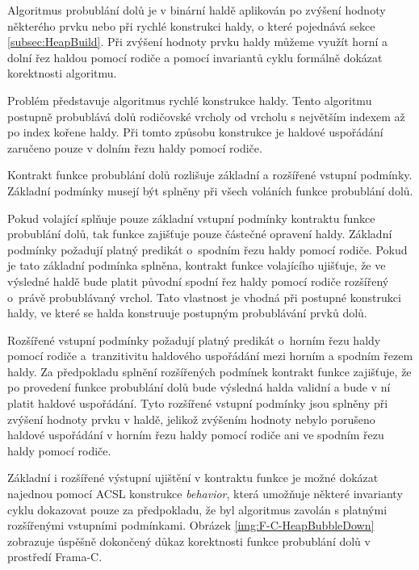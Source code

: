 Algoritmus probublání dolů je v binární haldě aplikován po zvýšení hodnoty některého prvku nebo při rychlé konstrukci haldy, o které pojednává sekce \ref{subsec:HeapBuild}. Při zvýšení hodnoty prvku haldy můžeme využít horní a dolní řez haldou pomocí rodiče a pomocí invariantů cyklu formálně dokázat korektnosti algoritmu.

Problém představuje algoritmus rychlé konstrukce haldy. Tento algoritmu postupně probublává dolů rodičovské vrcholy od vrcholu s největším indexem až po index kořene haldy. Při tomto způsobu konstrukce je haldové uspořádání zaručeno pouze v dolním řezu haldy pomocí rodiče.

Kontrakt funkce probublání dolů rozlišuje základní a rozšířené vstupní podmínky. Základní podmínky musejí být splněny při všech voláních funkce probublání dolů.

Pokud volající splňuje pouze základní vstupní podmínky kontraktu funkce probublání dolů, tak funkce zajišťuje pouze částečné opravení haldy. Základní podmínky požadují platný predikát o~spodním řezu haldy pomocí rodiče. Pokud je tato základní podmínka splněna, kontrakt funkce volajícího ujišťuje, že ve výsledné haldě bude platit původní spodní řez haldy pomocí rodiče rozšířený o~právě probublávaný vrchol. Tato vlastnost je vhodná při postupné konstrukci haldy, ve které se halda konstruuje postupným probublávání prvků dolů.

Rozšířené vstupní podmínky požadují platný predikát o~horním řezu haldy pomocí rodiče a~tranzitivitu haldového uspořádání mezi horním a spodním řezem haldy. Za předpokladu splnění rozšířených podmínek kontrakt funkce zajišťuje, že po provedení funkce probublání dolů bude výsledná halda validní a bude v ní platit haldové uspořádání. Tyto rozšířené vstupní podmínky jsou splněny při zvýšení hodnoty prvku v haldě, jelikož zvýšením hodnoty nebylo porušeno haldové uspořádání v horním řezu haldy pomocí rodiče ani ve spodním řezu haldy pomocí rodiče.

Základní i rozšířené výstupní ujištění v kontraktu funkce je možné dokázat najednou pomocí ACSL konstrukce \textit{behavior}, která umožňuje některé invarianty cyklu dokazovat pouze za předpokladu, že byl algoritmus zavolán s platnými rozšířenými vstupními podmínkami. Obrázek \ref{img:F-C-HeapBubbleDown} zobrazuje úspěšně dokončený důkaz korektnosti funkce probublání dolů v prostředí Frama-C.

